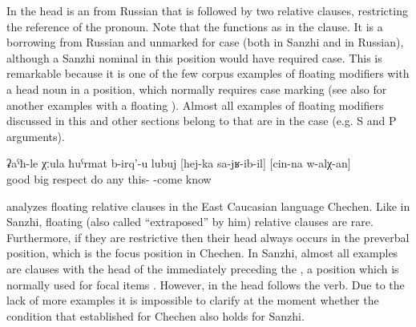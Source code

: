 In  the head is an  from Russian that is followed by two relative clauses, restricting the reference of the pronoun. Note that the  functions as  in the clause. It is a borrowing from Russian and unmarked for case (both in Sanzhi and in Russian), although a Sanzhi nominal in this position would have required  case. This is remarkable because it is one of the few corpus examples of floating modifiers with a head noun in a position, which normally requires case marking (see also  for another examples with a floating ). Almost all examples of floating modifiers discussed in this and other sections belong to  that are in the  case (e.g. S and P arguments).
%
\begin{exe}
	\ex	\label{ex:‎He gives respect to anybody who comes here, whom he knows}
	\gll	ʡaˁħ-le	χːula	ħuˁrmat	b-irq'-u	lubuj		[hej-ka	sa-jʁ-ib-il]	[cin-na	w-alχ-an]\\
		good	big	respect	do	any	this-	-come		know\\
	\glt	{}
\end{exe}

\citet{Komen2014} analyzes floating relative clauses in the East Caucasian language Chechen. Like in Sanzhi, floating (also called ``extraposed'' by him) relative clauses are rare. Furthermore, if they are restrictive then their head always occurs in the preverbal position, which is the focus position in Chechen. In Sanzhi, almost all examples are  clauses with the head of the  immediately preceding the , a position which is normally used for focal items . However, in  the head follows the verb. Due to the lack of more examples it is impossible to clarify at the moment whether the condition that \citet{Komen2014} established for Chechen also holds for Sanzhi.



